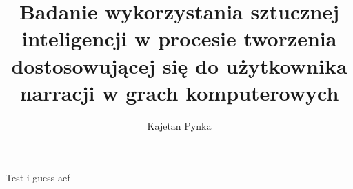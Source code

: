 \documentclass[magister,druk]{dyplom}
\author{Kajetan Pynka}
\title{Badanie wykorzystania sztucznej inteligencji w procesie tworzenia dostosowującej się do użytkownika narracji w grach komputerowych}
\begin{document}
\maketitle



Test i guess aef \cite{ai_town_ref}

\tableofcontents







\listoffigures
\listoflistings
\listoftables

\appendixpage
\appendix




\end{document}
